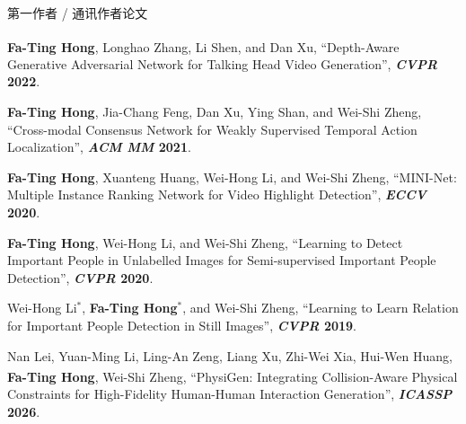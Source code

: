 \documentclass{resume}
\newcommand{\pubtopic}[2]{\par\needspace{3\baselineskip}\vspace{2pt}\noindent\hspace{8pt}{\color{#1}\rule[-1pt]{2.5pt}{9pt}}\hspace{5pt}{\small\bfseries\color{#1}#2}\par\vspace{1pt}}
\begin{document}
\begin{rSection}{第一作者 / 通讯作者论文}
\begin{enumerate}[label={\color{topicVG}[P\arabic*]}, start=1, leftmargin=26pt, labelsep=5pt, itemsep=0pt, parsep=0pt, topsep=0pt]
    \item \textbf{Fa-Ting Hong}, Longhao Zhang, Li Shen, and Dan Xu{\textsuperscript{\Letter}},
    ``Depth-Aware Generative Adversarial Network for Talking Head Video Generation'', \textbf{\textit{CVPR} 2022}.

    \item \textbf{Fa-Ting Hong}, Jia-Chang Feng, Dan Xu, Ying Shan, and Wei-Shi Zheng,
    ``Cross-modal Consensus Network for Weakly Supervised Temporal Action Localization'', \textbf{\textit{ACM MM} 2021}.

    \item \textbf{Fa-Ting Hong}, Xuanteng Huang, Wei-Hong Li, and Wei-Shi Zheng,
    ``MINI-Net: Multiple Instance Ranking Network for Video Highlight Detection'', \textbf{\textit{ECCV} 2020}.

    \item \textbf{Fa-Ting Hong}, Wei-Hong Li, and Wei-Shi Zheng,
    ``Learning to Detect Important People in Unlabelled Images for Semi-supervised Important People Detection'', \textbf{\textit{CVPR} 2020}.

    \item Wei-Hong Li$^*$, \textbf{Fa-Ting Hong}$^*$, and Wei-Shi Zheng,
    ``Learning to Learn Relation for Important People Detection in Still Images'', \textbf{\textit{CVPR} 2019}.

\end{enumerate}
\pubtopic{topicMO}{以人为中心的运动生成}
\begin{enumerate}[label={\color{topicMO}[P\arabic*]}, start=11, leftmargin=26pt, labelsep=5pt, itemsep=0pt, parsep=0pt, topsep=0pt]
    \item Nan Lei, Yuan-Ming Li, Ling-An Zeng, Liang Xu, Zhi-Wei Xia, Hui-Wen Huang, \textbf{Fa-Ting Hong}{\textsuperscript{\Letter}}, Wei-Shi Zheng,
    ``PhysiGen: Integrating Collision-Aware Physical Constraints for High-Fidelity Human-Human Interaction Generation'', \textbf{\textit{ICASSP} 2026}.

\end{enumerate}
\end{rSection}
\end{document}
